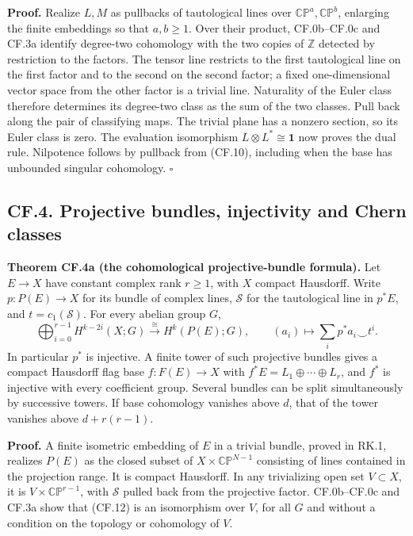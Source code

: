 \documentclass[
  11pt,
]{article}
\begin{document}
\textbf{Proof.} Realize \(L,M\) as pullbacks of tautological lines over
\(\mathbb{CP}^a,\mathbb{CP}^b\), enlarging the finite embeddings so that
\(a,b\geq1\). Over their product, CF.0b--CF.0c and CF.3a identify
degree-two cohomology with the two copies of \(\mathbb Z\) detected by
restriction to the factors. The tensor line restricts to the first
tautological line on the first factor and to the second on the second
factor; a fixed one-dimensional vector space from the other factor is a
trivial line. Naturality of the Euler class therefore determines its
degree-two class as the sum of the two classes. Pull back along the pair
of classifying maps. The trivial plane has a nonzero section, so its
Euler class is zero. The evaluation isomorphism
\(L\otimes L^*\cong\mathbf1\) now proves the dual rule. Nilpotence
follows by pullback from (CF.10), including when the base has unbounded
singular cohomology. \(\square\)

\subsection{CF.4. Projective bundles, injectivity and Chern
classes}\label{cf.4.-projective-bundles-injectivity-and-chern-classes}

\textbf{Theorem CF.4a (the cohomological projective-bundle formula).}
Let \(E\to X\) have constant complex rank \(r\geq1\), with \(X\) compact
Hausdorff. Write \(p:P(E)\to X\) for its bundle of complex lines,
\(\mathcal S\) for the tautological line in \(p^*E\), and
\(t=c_1(\mathcal S)\). For every abelian group \(G\), \[
\bigoplus_{i=0}^{r-1}H^{k-2i}(X;G)\xrightarrow{\ \cong\ }H^k(P(E);G),
\qquad (a_i)\longmapsto\sum_i p^*a_i\smile t^i.
\tag{CF.12}
\] In particular \(p^*\) is injective. A finite tower of such projective
bundles gives a compact Hausdorff flag base \(f:F(E)\to X\) with
\(f^*E=L_1\oplus\cdots\oplus L_r\), and \(f^*\) is injective with every
coefficient group. Several bundles can be split simultaneously by
successive towers. If base cohomology vanishes above \(d\), that of the
tower vanishes above \(d+r(r-1)\).

\textbf{Proof.} A finite isometric embedding of \(E\) in a trivial
bundle, proved in RK.1, realizes \(P(E)\) as the closed subset of
\(X\times\mathbb{CP}^{N-1}\) consisting of lines contained in the
projection range. It is compact Hausdorff. In any trivializing open set
\(V\subset X\), it is \(V\times\mathbb{CP}^{r-1}\), with \(\mathcal S\)
pulled back from the projective factor. CF.0b--CF.0c and CF.3a show that
(CF.12) is an isomorphism over \(V\), for all \(G\) and without a
condition on the topology or cohomology of \(V\).
\end{document}

